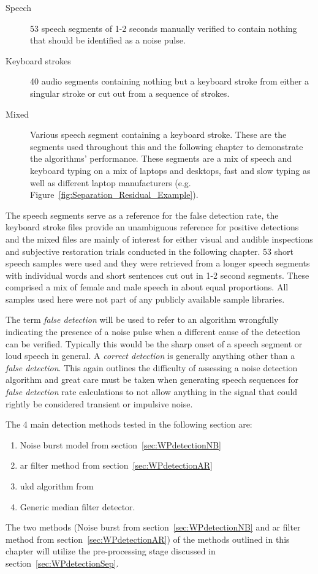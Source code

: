 \begin{description} \label{corrections:library}
  \item[Speech] 53 speech segments of 1-2 seconds manually verified to contain nothing that should be identified as a noise pulse.
  \item[Keyboard strokes] 40 audio segments containing nothing but a keyboard stroke from either a singular stroke or cut out from a sequence of strokes.
  \item[Mixed] Various speech segment containing a keyboard stroke. These are the segments used throughout this and the following chapter to demonstrate the algorithms' performance. These segments are a mix of speech and keyboard typing on a mix of laptops and desktops, fast and slow typing as well as different laptop manufacturers (e.g. Figure~\ref{fig:Separation_Residual_Example}).
\end{description}

The speech segments serve as a reference for the false detection rate, the keyboard stroke files provide an unambiguous reference for positive detections and the mixed files are mainly of interest for either visual and audible inspections and subjective restoration trials conducted in the following chapter. 53 short speech samples were used and they were retrieved from a longer speech segments with individual words and short sentences cut out in 1-2 second segments. These comprised a mix of female and male speech in about equal proportions. All samples used here were not part of any publicly available sample libraries.

The term \emph{false detection} will be used to refer to an algorithm wrongfully indicating the presence of a noise pulse when a different cause of the detection can be verified. Typically this would be the sharp onset of a speech segment or loud speech in general. A \emph{correct detection} is generally anything other than a \emph{false detection}. This again outlines the difficulty of assessing a noise detection algorithm and great care must be taken when generating speech sequences for \emph{false detection} rate calculations to not allow anything in the signal that could rightly be considered transient or impulsive noise.

The 4 main detection methods tested in the following section are:
\begin{enumerate}
  \item Noise burst model from section~\ref{sec:WPdetectionNB}
  \item \gls{ar} filter method from section~\ref{sec:WPdetectionAR}
  \item \gls{ukd} algorithm from \cite{Subramanya2007}
  \item Generic median filter detector.
\end{enumerate}
The two methods (Noise burst from section~\ref{sec:WPdetectionNB} and \gls{ar} filter method from section~\ref{sec:WPdetectionAR}) of the methods outlined in this chapter will utilize the pre-processing stage discussed in section~\ref{sec:WPdetectionSep}.

